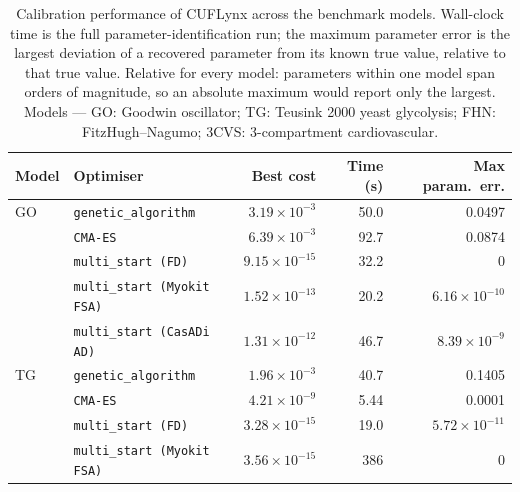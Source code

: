 

\begin{table}[htbp]
  \centering
  \caption{Calibration performance of CUFLynx across the benchmark models. Wall-clock time is the full parameter-identification run; the maximum parameter error is the largest deviation of a recovered parameter from its known true value, relative to that true value. Relative for every model: parameters within one model span orders of magnitude, so an absolute maximum would report only the largest. Models --- GO: Goodwin oscillator; TG: Teusink 2000 yeast glycolysis; FHN: FitzHugh--Nagumo; 3CVS: 3-compartment cardiovascular.}
  \label{tab:ca-calibration}
  \begin{tabular}{llrrr}
    \toprule
    Model & Optimiser & Best cost & Time (s) & Max param.\ err. \\
    \midrule
    GO & \texttt{genetic\_algorithm} & $3.19\times 10^{-3}$ & 50.0 & 0.0497 \\
     & \texttt{CMA-ES} & $6.39\times 10^{-3}$ & 92.7 & 0.0874 \\
     & \texttt{multi\_start (FD)} & $9.15\times 10^{-15}$ & 32.2 & 0 \\
     & \texttt{multi\_start (Myokit FSA)} & $1.52\times 10^{-13}$ & 20.2 & $6.16\times 10^{-10}$ \\
     & \texttt{multi\_start (CasADi AD)} & $1.31\times 10^{-12}$ & 46.7 & $8.39\times 10^{-9}$ \\
    \midrule
    TG & \texttt{genetic\_algorithm} & $1.96\times 10^{-3}$ & 40.7 & 0.1405 \\
     & \texttt{CMA-ES} & $4.21\times 10^{-9}$ & 5.44 & 0.0001 \\
     & \texttt{multi\_start (FD)} & $3.28\times 10^{-15}$ & 19.0 & $5.72\times 10^{-11}$ \\
     & \texttt{multi\_start (Myokit FSA)} & $3.56\times 10^{-15}$ & 386 & 0 \\

\end{tabular}
\end{table}
